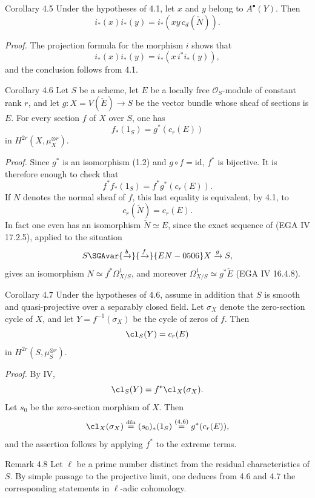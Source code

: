 \begin{statement}{Corollary 4.5}
Under the hypotheses of 4.1, let $x$ and $y$ belong to $A^\bullet(Y)$. Then
\[
i_*(x)i_*(y)=i_*(xy\,c_d(\check N)).
\]
\end{statement}

\emph{Proof.} The projection formula for the morphism $i$ shows that
\[
i_*(x)i_*(y)=i_*(x\,i^*i_*(y)),
\]
and the conclusion follows from 4.1.

\begin{statement}{Corollary 4.6}
Let $S$ be a scheme, let $E$ be a locally free $\mathcal O_S$-module of constant rank $r$, and let $g:X=V(\check E)\to S$ be the vector bundle whose sheaf of sections is $E$. For every section $f$ of $X$ over $S$, one has
\[
f_*(1_S)=g^*(c_r(E))
\]
in $H^{2r}(X,\mu_X^{\otimes r})$.
\end{statement}

\emph{Proof.} Since $g^*$ is an isomorphism (1.2) and $g\circ f=\mathrm{id}$, $f^*$ is bijective. It is therefore enough to check that
\[
f^*f_*(1_S)=f^*g^*(c_r(E)).
\]
If $N$ denotes the normal sheaf of $f$, this last equality is equivalent, by 4.1, to
\[
c_r(\check N)=c_r(E).
\]
In fact one even has an isomorphism $\check N\simeq E$, since the exact sequence of (EGA IV 17.2.5), applied to the situation
\[
S\SGAvar{\xrightarrow{b}}{\xrightarrow{f}}{EN-0506} X\xrightarrow{g} S,
\]
gives an isomorphism $N\simeq f^*\Omega^1_{X/S}$, and moreover $\Omega^1_{X/S}\simeq g^*\check E$ (EGA IV 16.4.8).

\begin{statement}{Corollary 4.7}
Under the hypotheses of 4.6, assume in addition that $S$ is smooth and quasi-projective over a separably closed field. Let $\sigma_X$ denote the zero-section cycle of $X$, and let $Y=f^{-1}(\sigma_X)$ be the cycle of zeros of $f$. Then
\[
\cl_S(Y)=c_r(E)
\]
in $H^{2r}(S,\mu_S^{\otimes r})$.
\end{statement}

\emph{Proof.} By IV,
\[
\cl_S(Y)=f^*\cl_X(\sigma_X).
\]
Let $s_0$ be the zero-section morphism of $X$. Then
\[
\cl_X(\sigma_X)\stackrel{\mathrm{dfn}}{=}(s_0)_*(1_S)\stackrel{(4.6)}{=}g^*(c_r(E)),
\]
and the assertion follows by applying $f^*$ to the extreme terms.

\begin{statement}{Remark 4.8}
Let $\ell$ be a prime number distinct from the residual characteristics of $S$. By simple passage to the projective limit, one deduces from 4.6 and 4.7 the corresponding statements in $\ell$-adic cohomology.
\end{statement}

